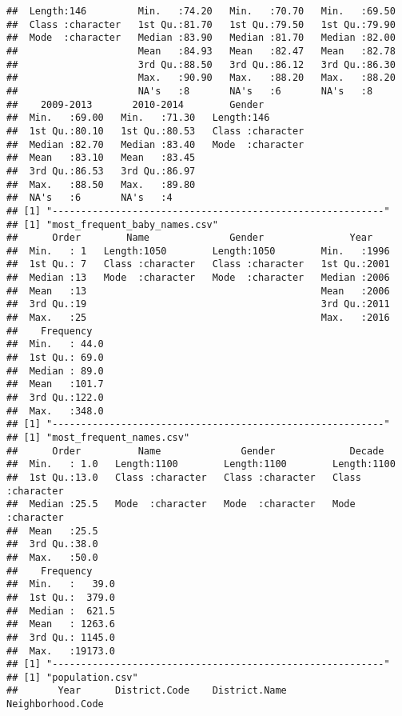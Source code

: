 \documentclass[
]{article}
\begin{document}
\begin{verbatim}
##  Length:146         Min.   :74.20   Min.   :70.70   Min.   :69.50  
##  Class :character   1st Qu.:81.70   1st Qu.:79.50   1st Qu.:79.90  
##  Mode  :character   Median :83.90   Median :81.70   Median :82.00  
##                     Mean   :84.93   Mean   :82.47   Mean   :82.78  
##                     3rd Qu.:88.50   3rd Qu.:86.12   3rd Qu.:86.30  
##                     Max.   :90.90   Max.   :88.20   Max.   :88.20  
##                     NA's   :8       NA's   :6       NA's   :8      
##    2009-2013       2010-2014        Gender         
##  Min.   :69.00   Min.   :71.30   Length:146        
##  1st Qu.:80.10   1st Qu.:80.53   Class :character  
##  Median :82.70   Median :83.40   Mode  :character  
##  Mean   :83.10   Mean   :83.45                     
##  3rd Qu.:86.53   3rd Qu.:86.97                     
##  Max.   :88.50   Max.   :89.80                     
##  NA's   :6       NA's   :4                         
## [1] "----------------------------------------------------------"
## [1] "most_frequent_baby_names.csv"
##      Order        Name              Gender               Year     
##  Min.   : 1   Length:1050        Length:1050        Min.   :1996  
##  1st Qu.: 7   Class :character   Class :character   1st Qu.:2001  
##  Median :13   Mode  :character   Mode  :character   Median :2006  
##  Mean   :13                                         Mean   :2006  
##  3rd Qu.:19                                         3rd Qu.:2011  
##  Max.   :25                                         Max.   :2016  
##    Frequency    
##  Min.   : 44.0  
##  1st Qu.: 69.0  
##  Median : 89.0  
##  Mean   :101.7  
##  3rd Qu.:122.0  
##  Max.   :348.0  
## [1] "----------------------------------------------------------"
## [1] "most_frequent_names.csv"
##      Order          Name              Gender             Decade         
##  Min.   : 1.0   Length:1100        Length:1100        Length:1100       
##  1st Qu.:13.0   Class :character   Class :character   Class :character  
##  Median :25.5   Mode  :character   Mode  :character   Mode  :character  
##  Mean   :25.5                                                           
##  3rd Qu.:38.0                                                           
##  Max.   :50.0                                                           
##    Frequency      
##  Min.   :   39.0  
##  1st Qu.:  379.0  
##  Median :  621.5  
##  Mean   : 1263.6  
##  3rd Qu.: 1145.0  
##  Max.   :19173.0  
## [1] "----------------------------------------------------------"
## [1] "population.csv"
##       Year      District.Code    District.Name      Neighborhood.Code

\end{verbatim}
\end{document}
